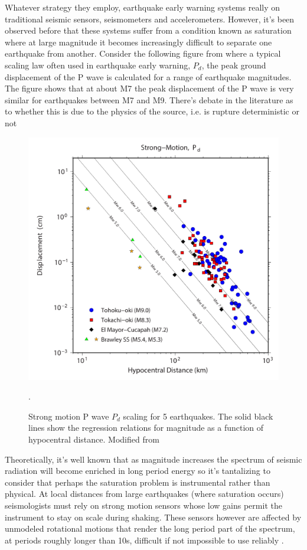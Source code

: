 	Whatever strategy they employ, earthquake early warning systems really on traditional seismic sensors, seismometers and accelerometers. However, it's been observed before that these systems suffer from a condition known as saturation \citep{Brown2011} where at large magnitude it becomes increasingly difficult to separate one earthquake from another. Consider the following figure from \citet{Crowell2013} where a typical scaling law often used in earthquake early warning, $P_d$, the peak ground displacement of the P wave \citep{wu2007_Pd} is calculated for a range of earthquake magnitudes. The figure shows that at about M7 the peak displacement of the P wave is very similar for earthquakes between M7 and M9. There's debate in the literature as to whether this is due to the physics of the source, i.e. is rupture deterministic or not \citep{olson2005}

\begin{figure}[!ht] 
  \centering
  \includegraphics[width=0.99\linewidth]{./figures/ch1/pd_scaling.pdf}
    \caption[Strong motion $P_d$ scaling]{Strong motion P wave $P_d$ scaling for 5 earthquakes. The solid black lines show the regression relations for magnitude as a function of hypocentral distance. Modified from \citep{Crowell2013}}.
  \label{fig_pd_scaling}
\end{figure}

Theoretically, it's well known that as magnitude increases the spectrum of seismic radiation will become enriched in long period energy \citep{haskell1964total,brune1970} so it's tantalizing to consider that perhaps the saturation problem is instrumental rather than physical. At local distances from large earthquakes (where saturation occurs) seismologists must rely on strong motion sensors whose low gains permit the instrument to stay on scale during shaking. These sensors however are affected by unmodeled rotational motions \citep{Trifunac2001} that render the long period part of the spectrum, at periods roughly longer than 10s, difficult if not impossible to use reliably \citep{Boore2005}.

